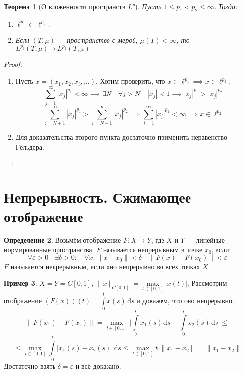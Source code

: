 \documentclass[11pt,openany,a4paper]{scrartcl}
\theoremstyle{plain}
\newtheorem{theorem}{Теорема}[section]
\theoremstyle{definition}
\newtheorem{definition}[theorem]{Определение}
\newtheorem{example}[theorem]{Пример}
\newcommand{\dif}{\, \mathrm d}
\begin{document}
\begin{theorem}[О вложенности пространств $L^p$]
Пусть $1 \leqslant p_1 < p_2 \leqslant \infty$. Тогда:
    \begin{enumerate}
        \item $\ell^{p_1} \subset \ell^{p_2}$.
        \item Если $(T, \mu)$ — пространство с мерой, $\mu(T) < \infty$, то
        $L^{p_1}(T, \mu) \supset L^{p_2}(T, \mu)$
    \end{enumerate}
\end{theorem}
\pagebreak
\begin{proof}
\mbox{}
    \begin{enumerate}
        \item Пусть $x = (x_1, x_2, x_3, \ldots)$. Хотим проверить, что
        $x \in \ell^{p_1} \implies x \in \ell^{p_2}$.
        $$
        \sum\limits_{j = 1}^\infty |x_j|^{p_1} < \infty \implies
        \exists N\quad \forall j > N\quad |x_j| < 1 \implies
        |x_j|^{p_1} > |x_j|^{p_2}
        $$
        $$
        \sum\limits_{j = N + 1}^\infty |x_j|^{p_1} >
        \sum\limits_{j = N + 1}^\infty |x_j|^{p_2} \implies
        \sum\limits_{j = 1}^\infty |x_j|^{p_2} < \infty \implies x \in \ell^{p_2}
        $$
        \item Для доказательства второго пункта достаточно применить неравенство 
        Гёльдера.
    \end{enumerate}
\end{proof}

\section{Непрерывность. Сжимающее отображение}

\begin{definition}
    Возьмём отображение $F: X \to Y$, где $X$ и $Y$ — линейные нормированные
    пространства. $F$ называется непрерывным в точке $x_0$, если:
    $$
    \forall \varepsilon > 0\quad
    \exists \delta > 0:\quad \forall x: \|x - x_0\| < \delta\quad
    \|F(x) -F(x_0)\| < \varepsilon
    $$
    $F$ называется непрерывным, если оно непрерывно во всех точках $X$.
\end{definition}

\begin{example}
        $X = Y = C[0, 1]$, $\|x\|_{C[0, 1]} =
        \max\limits_{t \in [0, 1]} |x(t)|$. Рассмотрим отображение
        $(F(x))(t) = \int\limits_0^t x(s)\dif s$ и докажем, что оно 
        непрерывно.
        $$
        \|F(x_1) - F(x_2)\| = \max_{t \in [0, 1]}
        \bigg|\int\limits_0^t x_1(s)\dif s - \int\limits_0^t x_2(s)\dif s\bigg|
        \leqslant
        $$
        $$
        \leqslant
        \max_{t \in [0, 1]} \int\limits_0^t |x_1(s) - x_2(s)|\dif s \leqslant
        \max_{t \in [0, 1]} t \cdot \|x_1 - x_2\| = \|x_1 - x_2\|
        $$
        Достаточно взять $\delta = \varepsilon$ и всё доказано.
\end{example}
\end{document}

